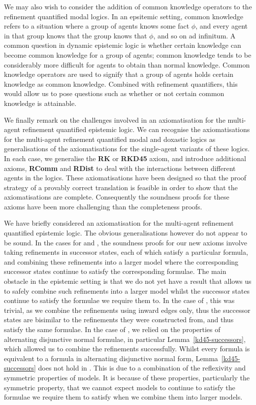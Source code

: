 We may also wish to consider the addition of common knowledge operators to the
refinement quantified modal logics. In an epsitemic setting, common knowledge
refers to a situation where a group of agents knows some fact $\phi$, and every
agent in that group knows that the group knows that $\phi$, and so on ad
infinitum. A common question in dynamic epistemic logic is whether certain
knowledge can become common knowledge for a group of agents; common knowledge
tends to be considerably more difficult for agents to obtain than normal
knowledge. Common knowledge operators are used to signify that a group of agents
holds certain knowledge as common knowledge. Combined with refinement
quantifiers, this would allow us to pose questions such as whether or not
certain common knowledge is attainable.

We finally remark on the challenges involved in an axiomatisation for the
multi-agent refinement quantified epistemic logic. We can recognise the
axiomatisations for the multi-agent refinement quantified modal and doxastic
logics as generalisations of the axiomatisations for the single-agent variants
of these logics. In each case, we generalise the {\bf RK} or {\bf RKD45} axiom,
and introduce additional axioms, {\bf RComm} and {\bf RDist} to deal with the
interactions between different agents in the logics. These axiomatisations have
been designed so that the proof strategy of a provably correct translation is
feasible in order to show that the axiomatisations are complete. Consequently
the soundness proofs for these axioms have been more challenging than the
completeness proofs.

We have briefly considered an axiomatisation for the multi-agent refinement
quantified epistemic logic. The obvious generalisations however do not appear to
be sound. In the cases for \classK{} and \classKD{}, the soundness proofs for
our new axioms involve taking refinements in successor states, each of which
satisfy a particular formula, and combining these refinements into a larger
model where the corresponding successor states continue to satisfy the
corresponding formulae. The main obstacle in the epistemic setting is that we do
not yet have a result that allows us to safely combine such refinements into a
larger model whilst the successor states continue to satisfy the formulae we
require them to.  In the case of \classK{}, this was trivial, as we combine the
refinements using inward edges only, thus the successor states are bisimilar to
the refinements they were constructed from, and thus satisfy the same formulae.
In the case of \classKD{}, we relied on the properties of alternating
disjunctive normal formulae, in particular Lemma~\ref{kd45-successors}, which
allowed us to combine the refinements successfully.  Whilst every \logicS{}
formula is equivalent to a formula in alternating disjunctive normal form,
Lemma~\ref{kd45-successors} does not hold in \logicS{}. This is due to a
combination of the reflexivity and symmetric properties of \classS{} models. It
is because of these properties, particularly the symmetric property, that we
cannot expect models to continue to satisfy the formulae we require them to
satisfy when we combine them into larger models. 

